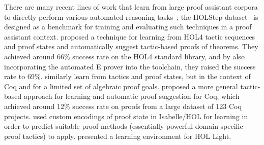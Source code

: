 There are many recent lines of work that learn from large proof assistant corpora to directly perform various automated reasoning tasks~\citep{Kuhlwein2012,Kuhlwein2013,Kaliszyk2014,Irving2016,Loos2017,Peng2017}; the HOLStep dataset~\citep{Kaliszyk2017} is designed as a benchmark for training and evaluating such techniques in a proof assistant context. \cite{Gauthier2017b,Gauthier2018} proposed a technique for learning from HOL4 tactic sequences and proof states and automatically suggest tactic-based proofs of theorems. They achieved around 66\% success rate on the HOL4 standard library, and by also incorporating the automated E prover into the toolchain, they raised the success rate to 69\%. \cite{Huang2018} similarly learn from tactics and proof states, but in the context of Coq and for a limited set of algebraic proof goals. \cite{Yang2019} proposed a more general tactic-based approach for learning and automatic proof suggestion for Coq, which achieved around 12\% success rate on proofs from a large dataset of 123 Coq projects. \cite{Nagashima2018} used custom encodings of proof state in Isabelle/HOL for learning in order to predict suitable proof methods (essentially powerful domain-specific proof tactics) to apply. \cite{Bansal2019} presented a learning environment for HOL Light.
